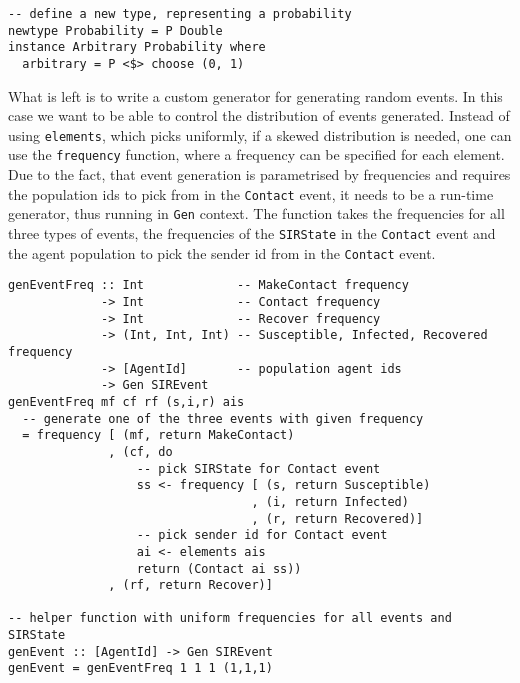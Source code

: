 \begin{footnotesize}
\begin{verbatim}
-- define a new type, representing a probability
newtype Probability = P Double
instance Arbitrary Probability where
  arbitrary = P <$> choose (0, 1)
\end{verbatim}
\end{footnotesize}

What is left is to write a custom generator for generating random events. In this case we want to be able to control the distribution of events generated. Instead of using \texttt{elements}, which picks uniformly, if a skewed distribution is needed, one can use the \texttt{frequency} function, where a frequency can be specified for each element. Due to the fact, that event generation is parametrised by frequencies and requires the population ids to pick from in the \texttt{Contact} event, it needs to be a run-time generator, thus running in \texttt{Gen} context. The function takes the frequencies for all three types of events, the frequencies of the \texttt{SIRState} in the \texttt{Contact} event and the agent population to pick the sender id from in the \texttt{Contact} event.

\begin{footnotesize}
\begin{verbatim}
genEventFreq :: Int             -- MakeContact frequency
             -> Int             -- Contact frequency
             -> Int             -- Recover frequency
             -> (Int, Int, Int) -- Susceptible, Infected, Recovered frequency
             -> [AgentId]       -- population agent ids
             -> Gen SIREvent
genEventFreq mf cf rf (s,i,r) ais
  -- generate one of the three events with given frequency
  = frequency [ (mf, return MakeContact)
              , (cf, do
                  -- pick SIRState for Contact event
                  ss <- frequency [ (s, return Susceptible)
                                  , (i, return Infected)
                                  , (r, return Recovered)]
                  -- pick sender id for Contact event
                  ai <- elements ais
                  return (Contact ai ss))
              , (rf, return Recover)]
         
-- helper function with uniform frequencies for all events and SIRState
genEvent :: [AgentId] -> Gen SIREvent
genEvent = genEventFreq 1 1 1 (1,1,1) 
\end{verbatim}
\end{footnotesize}

